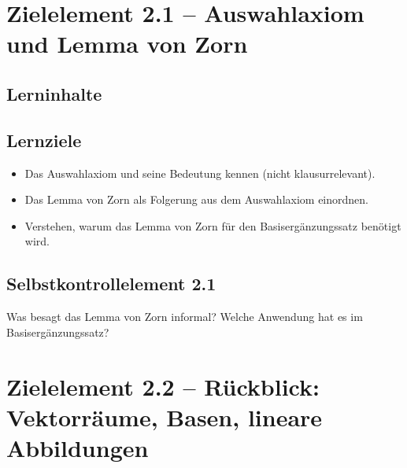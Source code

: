 \documentclass[a4paper,12pt]{article}
\begin{document}
\section*{Zielelement 2.1 -- Auswahlaxiom und Lemma von Zorn}

\subsection*{Lerninhalte}
\begin{center}
\end{center}

\subsection*{Lernziele}
\begin{itemize}
  \item Das Auswahlaxiom und seine Bedeutung kennen (nicht klausurrelevant).
  \item Das Lemma von Zorn als Folgerung aus dem Auswahlaxiom einordnen.
  \item Verstehen, warum das Lemma von Zorn für den Basisergänzungssatz benötigt wird.
\end{itemize}

\subsection*{Selbstkontrollelement 2.1}
Was besagt das Lemma von Zorn informal? Welche Anwendung hat es im Basisergänzungssatz?

\newpage

\section*{Zielelement 2.2 -- Rückblick: Vektorräume, Basen, lineare Abbildungen}
\end{document}
